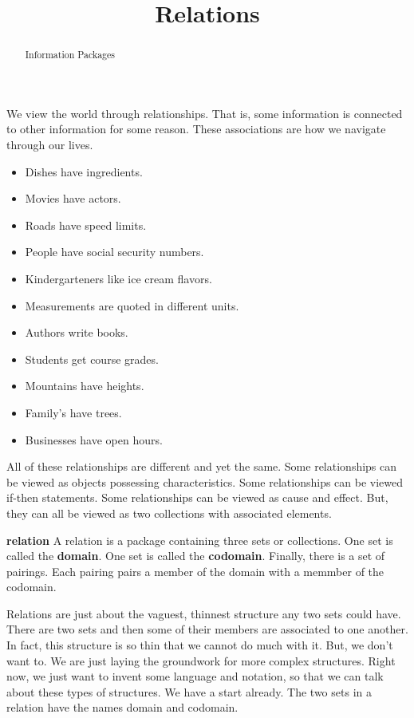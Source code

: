 \documentclass{ximera}
\title{Relations}
\begin{document}
\begin{abstract}
Information Packages
\end{abstract}
\maketitle


We view the world through relationships. That is, some information is connected to other information for some reason. These associations are how we navigate through our lives.

\begin{itemize}
\item Dishes have ingredients.
\item Movies have actors.
\item Roads have speed limits.
\item People have social security numbers.
\item Kindergarteners like ice cream flavors.
\item Measurements are quoted in different units.
\item Authors write books.
\item Students get course grades.
\item Mountains have heights.
\item Family's have trees.
\item Businesses have open hours.
\end{itemize}


All of these relationships are different and yet the same.  Some relationships can be viewed as objects possessing characteristics. Some relationships can be viewed if-then statements.  Some relationships can be viewed as cause and effect. But, they can all be viewed as two collections with associated elements.
\\






\begin{definition} \textbf{relation} 
A relation is a package containing three sets or collections. One set is called the \textbf{domain}. One set is called the \textbf{codomain}.  Finally, there is a set of pairings.  Each pairing pairs a member of the domain with a memmber of the codomain.
\end{definition}

Relations are just about the vaguest, thinnest structure any two sets could have. There are two sets and then some of their members are associated to one another. In fact, this structure is so thin that we cannot do much with it.  But, we don't want to.  We are just laying the groundwork for more complex structures.  Right now, we just want to invent some language and notation, so that we can talk about these types of structures. We have a start already. The two sets in a relation have the names domain and codomain.
\\
\end{document}
